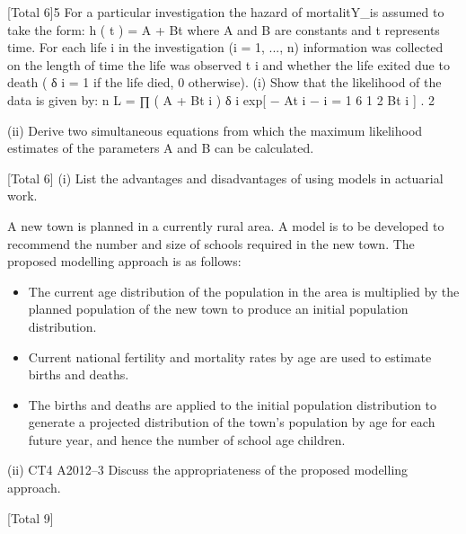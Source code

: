 \documentclass[a4paper,12pt]{article}
\begin{document}
\begin{enumerate}

[Total 6]5
For a particular investigation the hazard of mortalitY_is assumed to take the form:
h ( t ) = A + Bt
where A and B are constants and t represents time.
For each life i in the investigation (i = 1, ..., n) information was collected on the
length of time the life was observed t i and whether the life exited due to death ( δ i = 1
if the life died, 0 otherwise).
(i)
Show that the likelihood of the data is given by:
n
L = ∏ ( A + Bt i ) δ i exp[ − At i −
i = 1
6
1 2
Bt i ] .
2

(ii) Derive two simultaneous equations from which the maximum likelihood
estimates of the parameters A and B can be calculated.

[Total 6]
(i) List the advantages and disadvantages of using models in actuarial work.

A new town is planned in a currently rural area. A model is to be developed to
recommend the number and size of schools required in the new town. The proposed
modelling approach is as follows:
\begin{itemize}
\item The current age distribution of the population in the area is multiplied by the planned population of the new town to produce an initial population distribution.
\item Current national fertility and mortality rates by age are used to estimate births and
deaths.
\item The births and deaths are applied to the initial population distribution to generate
a projected distribution of the town’s population by age for each future year, and
hence the number of school age children.
\end{itemize}
(ii)
CT4 A2012–3
Discuss the appropriateness of the proposed modelling approach.

[Total 9]


\end{enumerate}
\end{document}
